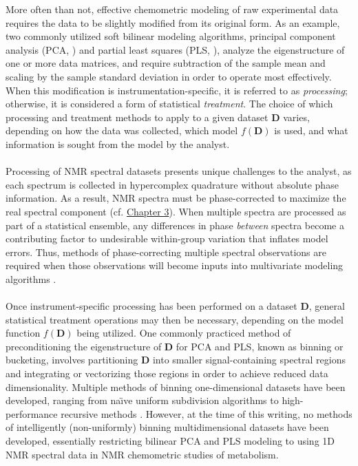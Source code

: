 \begin{doublespace}
More often than not, effective chemometric modeling of raw experimental data
requires the data to be slightly modified from its original form. As an
example, two commonly utilized soft bilinear modeling algorithms, principal
component analysis (PCA, \cite{jolliffe2002}) and partial least squares
(PLS, \cite{wold1993}), analyze the eigenstructure of one or more data
matrices, and require subtraction of the sample mean and scaling by the sample
standard deviation in order to operate most effectively. When this modification
is instrumentation-specific, it is referred to as {\it processing}; otherwise,
it is considered a form of statistical {\it treatment}. The choice of which
processing and treatment methods to apply to a given dataset $\mathbf{D}$
varies, depending on how the data was collected, which model $f(\mathbf{D})$
is used, and what information is sought from the model by the analyst.
\\\\
Processing of NMR spectral datasets presents unique challenges to the analyst,
as each spectrum is collected in hypercomplex quadrature
\cite{schuyler:jmr2013} without absolute phase information. As a result,
NMR spectra must be phase-corrected to maximize the real spectral component
(cf. \hyperlink{chapter.3}{Chapter 3}). When multiple spectra are processed as
part of a statistical ensemble, any differences in phase {\it between} spectra
become a contributing factor to undesirable within-group variation that
inflates model errors. Thus, methods of phase-correcting multiple spectral
observations are required when those observations will become inputs into
multivariate modeling algorithms \cite{worley:cils2014}.
\\\\
Once instrument-specific processing has been performed on a dataset
$\mathbf{D}$, general statistical treatment operations may then be necessary,
depending on the model function $f(\mathbf{D})$ being utilized. One commonly
practiced method of preconditioning the eigenstructure of $\mathbf{D}$ for
PCA and PLS, known as binning or bucketing, involves partitioning $\mathbf{D}$
into smaller signal-containing spectral regions and integrating or vectorizing
those regions in order to achieve reduced data dimensionality. Multiple methods
of binning one-dimensional datasets have been developed, ranging from
na\"{\i}ve uniform subdivision algorithms
\cite{hedenstrom:cils2008,sousa:cils2013} to high-performance recursive
methods \cite{davis:cils2007,demeyer:anchem2008}. However, at the time
of this writing, no methods of intelligently (non-uniformly) binning
multidimensional datasets have been developed, essentially restricting bilinear
PCA and PLS modeling to using 1D \hnmr{} NMR spectral data in NMR chemometric
studies of metabolism.
\end{doublespace}

